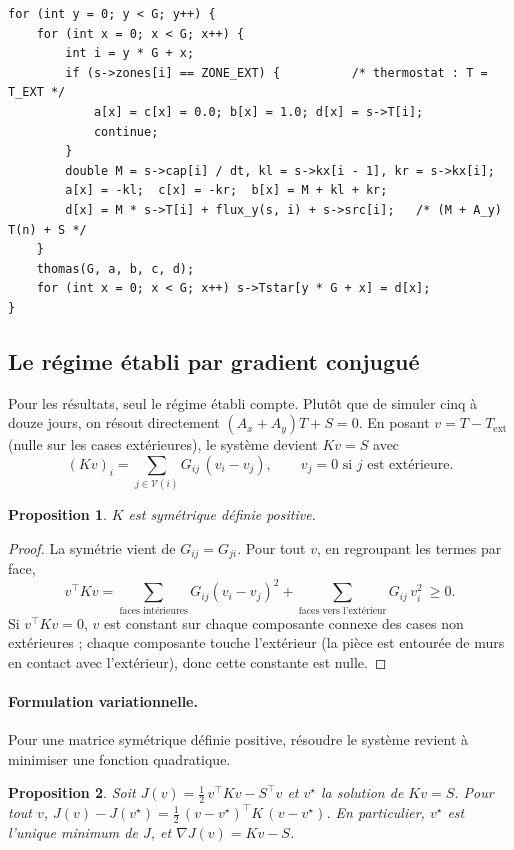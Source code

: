 \documentclass[11pt,a4paper]{article}
\newtheorem{proposition}{Proposition}
\theoremstyle{definition}
\theoremstyle{remark}
\newcommand{\Text}{T_{\mathrm{ext}}}
\begin{document}
\begin{lstlisting}[caption={Première étape d'un pas (lignes), extrait de \texttt{physics.c}}]
for (int y = 0; y < G; y++) {
    for (int x = 0; x < G; x++) {
        int i = y * G + x;
        if (s->zones[i] == ZONE_EXT) {          /* thermostat : T = T_EXT */
            a[x] = c[x] = 0.0; b[x] = 1.0; d[x] = s->T[i];
            continue;
        }
        double M = s->cap[i] / dt, kl = s->kx[i - 1], kr = s->kx[i];
        a[x] = -kl;  c[x] = -kr;  b[x] = M + kl + kr;
        d[x] = M * s->T[i] + flux_y(s, i) + s->src[i];   /* (M + A_y) T(n) + S */
    }
    thomas(G, a, b, c, d);
    for (int x = 0; x < G; x++) s->Tstar[y * G + x] = d[x];
}
\end{lstlisting}

\subsection{Le régime établi par gradient conjugué}

Pour les résultats, seul le régime établi compte. Plutôt que de simuler cinq à douze
jours, on résout directement $(A_x+A_y)T + S = 0$. En posant $v = T - \Text$
(nulle sur les cases extérieures), le système devient $Kv = S$ avec
\[
(Kv)_i = \sum_{j\in\mathcal{V}(i)} G_{ij}\,(v_i - v_j),\qquad v_j = 0 \text{ si $j$ est extérieure.}
\]

\begin{proposition}
$K$ est symétrique définie positive.
\end{proposition}

\begin{proof}
La symétrie vient de $G_{ij}=G_{ji}$. Pour tout $v$, en regroupant les termes par face,
\[
v^{\top}Kv = \sum_{\text{faces intérieures}} G_{ij}(v_i-v_j)^2
+ \sum_{\text{faces vers l'extérieur}} G_{ij}\,v_i^2 \ \ge 0.
\]
Si $v^{\top}Kv = 0$, $v$ est constant sur chaque composante connexe des cases
non extérieures ; chaque composante touche l'extérieur (la pièce est entourée de
murs en contact avec l'extérieur), donc cette constante est nulle.
\end{proof}

\paragraph{Formulation variationnelle.} Pour une matrice symétrique définie
positive, résoudre le système revient à minimiser une fonction quadratique.

\begin{proposition}\label{prop-variationnel}
Soit $J(v) = \frac12\,v^{\top}Kv - S^{\top}v$ et $v^\star$ la solution de $Kv = S$.
Pour tout $v$, $J(v) - J(v^\star) = \frac12\,(v - v^\star)^{\top}K\,(v - v^\star)$.
En particulier, $v^\star$ est l'unique minimum de $J$, et $\nabla J(v) = Kv - S$.
\end{proposition}
\end{document}
